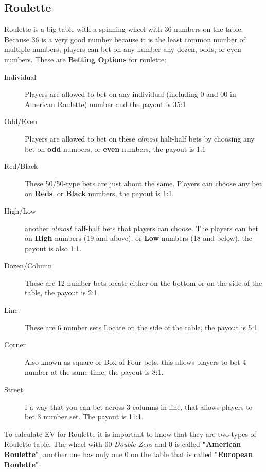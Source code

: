 \documentclass{article}
\begin{document}
\subsection{Roulette}
Roulette is a big table with a spinning wheel with 36 numbers on the table.  Because 36 is a very good number because it is the least common number of multiple numbers, players can bet on any number any dozen, odds, or even numbers. These are \textbf{Betting Options} for roulette:\par
\begin{description}
\item[Individual] Players are allowed to bet on any individual (including 0 and 00 in American Roulette) number and the payout is 35:1
\item[Odd/Even] Players are allowed to bet on these \emph{almost} half-half bets by choosing any bet on \textbf{odd} numbers, or \textbf{even} numbers, the payout is 1:1
\item[Red/Black] These 50/50-type bets are just about the same.  Players can  choose any bet on \textbf{Reds}, or \textbf{Black} numbers, the payout is 1:1
\item[High/Low] another \emph{almost} half-half bets that players can choose.  The players can bet on \textbf{High} numbers (19 and above), or \textbf{Low} numbers (18 and below), the payout is also 1:1.
\item[Dozen/Column] These are 12 number bets locate either on the bottom or on the side of the table, the payout is 2:1
\item[Line] These are 6 number sets Locate on the side of the table, the payout is 5:1
\item[Corner] Also known as square or Box of Four bets, this allows players to bet 4 number at the same time, the payout is 8:1.
\item[Street] I a way that you can bet across 3 columns in line, that allows players to bet 3 number set.  The payout is 11:1.

\end{description}

To calculate EV for Roulette it is important to know that they are two types of Roulette table.  The wheel with 00 \emph{Double Zero} and 0 is called \textbf{"American Roulette"}, another one has only one 0 on the table that is called \textbf{"European Roulette"}. 
\end{document}

